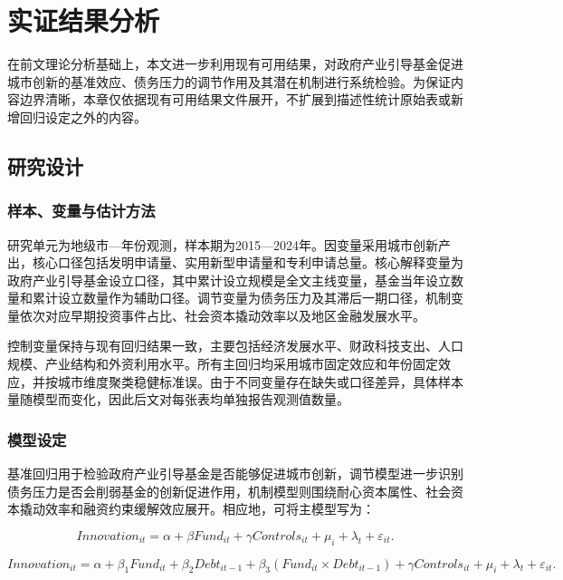
\section{实证结果分析}

在前文理论分析基础上，本文进一步利用现有可用结果，对政府产业引导基金促进城市创新的基准效应、债务压力的调节作用及其潜在机制进行系统检验。为保证内容边界清晰，本章仅依据现有可用结果文件展开，不扩展到描述性统计原始表或新增回归设定之外的内容。

\subsection{研究设计}

\subsubsection{样本、变量与估计方法}

研究单元为地级市—年份观测，样本期为2015—2024年。因变量采用城市创新产出，核心口径包括发明申请量、实用新型申请量和专利申请总量。核心解释变量为政府产业引导基金设立口径，其中累计设立规模是全文主线变量，基金当年设立数量和累计设立数量作为辅助口径。调节变量为债务压力及其滞后一期口径，机制变量依次对应早期投资事件占比、社会资本撬动效率以及地区金融发展水平。

控制变量保持与现有回归结果一致，主要包括经济发展水平、财政科技支出、人口规模、产业结构和外资利用水平。所有主回归均采用城市固定效应和年份固定效应，并按城市维度聚类稳健标准误。由于不同变量存在缺失或口径差异，具体样本量随模型而变化，因此后文对每张表均单独报告观测值数量。

\subsubsection{模型设定}

基准回归用于检验政府产业引导基金是否能够促进城市创新，调节模型进一步识别债务压力是否会削弱基金的创新促进作用，机制模型则围绕耐心资本属性、社会资本撬动效率和融资约束缓解效应展开。相应地，可将主模型写为：

\begin{equation}
Innovation_{it}=\alpha+\beta Fund_{it}+\gamma Controls_{it}+\mu_i+\lambda_t+\varepsilon_{it}.
\end{equation}

\begin{equation}
Innovation_{it}=\alpha+\beta_1 Fund_{it}+\beta_2 Debt_{it-1}+\beta_3(Fund_{it}\times Debt_{it-1})+\gamma Controls_{it}+\mu_i+\lambda_t+\varepsilon_{it}.
\end{equation}

